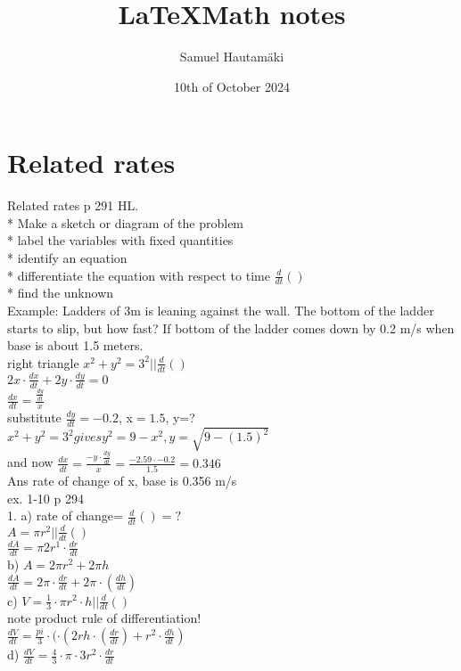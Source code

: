 \documentclass{article}
\title{\LaTeX Math notes}
\author{Samuel Hautamäki}
\date{10th of October 2024}
\begin{document}
  \maketitle
   
  \section{Related rates}
  Related rates p 291 HL.\\
  * Make a sketch or diagram of the problem\\
  * label the variables with fixed quantities\\
  * identify an equation\\
  * differentiate the equation with respect to time $\frac{d}{dt}()$\\
  * find the unknown\\
  Example: Ladders of 3m is leaning against the wall. The bottom of the ladder starts to slip, but how fast?
  If bottom of the ladder comes down by 0.2 m/s when base is about 1.5 meters.\\
  right triangle $x^2+y^2=3^2 || \frac{d}{dt}()$\\
  $2x\cdot\frac{dx}{dt}+2y\cdot\frac{dy}{dt}=0$\\
  $\frac{dx}{dt}=\frac{\frac{dy}{dt}}{x}$\\
  substitute $\frac{dy}{dt}=-0.2$, x$=1.5$, y=?\\
  $x^2+y^2=3^2 gives y^2=9-x^2, y=\sqrt{9-(1.5)^2}$\\
  and now $\frac{dx}{dt}=\frac{-y\cdot\frac{dy}{dt}}{x}=\frac{-2.59\cdot-0.2}{1.5}=0.346$\\
  Ans rate of change of x, base is 0.356 m/s\\
  ex. 1-10 p 294\\
  1. a) rate of change= $\frac{d}{dt}()=?$\\
  $A=\pi r^2 || \frac{d}{dt}()$\\
  $\frac{dA}{dt}=\pi2r^1\cdot\frac{dr}{dt}$\\
  b) $A=2\pi r^2+2\pi h$\\
  $\frac{dA}{dt}=2\pi\cdot\frac{dr}{dt}+2\pi\cdot(\frac{dh}{dt})$\\
  c) $V=\frac{1}{3}\cdot\pi r^2\cdot h || \frac{d}{dt}()$\\
  note product rule of differentiation!\\
  $\frac{dV}{dt}=\frac{pi}{3}\cdot(\cdot(2rh\cdot(\frac{dr}{dt})+r^2\cdot\frac{dh}{dt})$\\
  d) $\frac{dV}{dt}=\frac{4}{3}\cdot\pi\cdot 3r^2\cdot\frac{dr}{dt}$\\
\end{document}
